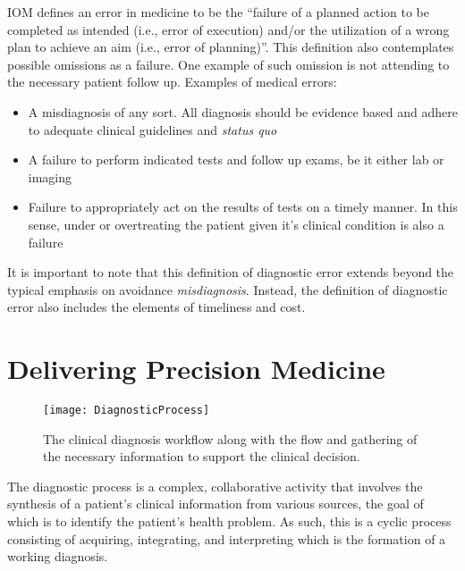 IOM defines an error in medicine to be the “failure of a planned action to be completed as intended (i.e., error of execution) and/or the utilization of a wrong plan to achieve an aim (i.e., error of planning)”\cite{iom2004}. This definition also contemplates possible omissions as a failure. One example of such omission is not attending to the necessary patient follow up. Examples of medical errors:

\begin{itemize}
\item A misdiagnosis of any sort. All diagnosis should be evidence based and adhere to adequate clinical guidelines and \emph{status quo}
\item A failure to perform indicated tests and follow up exams, be it either lab or imaging
\item Failure to appropriately act on the results of tests on a timely manner. In this sense, under or overtreating the patient given it's clinical condition is also a failure
\end{itemize}

It is important to note that this definition of diagnostic error extends beyond the typical emphasis on avoidance \emph{misdiagnosis}. Instead, the definition of diagnostic error also includes the elements of timeliness and cost.

\section{Delivering Precision Medicine}

\begin{figure}
\begin{centering}
\texttt{[image: DiagnosticProcess]}
\par\end{centering}
\caption{\label{fig:DiagnosticProcess}The clinical diagnosis workflow along with the flow and gathering of the necessary information to support the clinical decision\cite{parasuraman2000}.}
\end{figure}

The diagnostic process is a complex, collaborative activity that involves the synthesis of a patient’s clinical information from various sources, the goal of which is to identify the patient’s health problem. As such, this is a cyclic process consisting of acquiring, integrating, and interpreting which is the formation of a working diagnosis. 

